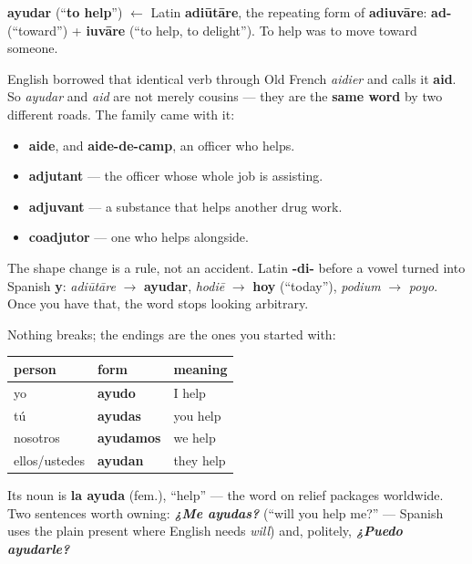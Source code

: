 \begin{cousinweb}
\textbf{ayudar} (\textquotedblleft{}\textbf{to help}\textquotedblright{}) $\leftarrow$ Latin \textbf{adiūtāre}, the repeating form of \textbf{adiuvāre}: \textbf{ad-} (\textquotedblleft{}toward\textquotedblright{}) + \textbf{iuvāre} (\textquotedblleft{}to help, to delight\textquotedblright{}). To help was to move toward someone.

English borrowed that identical verb through Old French \emph{aidier} and calls it \textbf{aid}. So \emph{ayudar} and \emph{aid} are not merely cousins — they are the \textbf{same word} by two different roads. The family came with it:

\begin{itemize}
\raggedright
  \item \textbf{aide}, and \textbf{aide-de-camp}, an officer who helps.
  \item \textbf{adjutant} — the officer whose whole job is assisting.
  \item \textbf{adjuvant} — a substance that helps another drug work.
  \item \textbf{coadjutor} — one who helps alongside.
\end{itemize}

The shape change is a rule, not an accident. Latin \textbf{-di-} before a vowel turned into Spanish \textbf{y}: \emph{adiūtāre} $\to$ \textbf{ayudar}, \emph{hodiē} $\to$ \textbf{hoy} (\textquotedblleft{}today\textquotedblright{}), \emph{podium} $\to$ \emph{poyo}. Once you have that, the word stops looking arbitrary.
\end{cousinweb}

\begin{grammarlens}[title={Grammar Lens: a plain -ar verb, and how to ask for a hand}]
Nothing breaks; the endings are the ones you started with:

\noindent
\begin{tabularx}{\linewidth}{@{}>{\raggedright\arraybackslash}X>{\raggedright\arraybackslash}X>{\raggedright\arraybackslash}X@{}}
\toprule
\textbf{person} & \textbf{form} & \textbf{meaning} \\
\midrule
yo & \textbf{ayudo} & I help \\
tú & \textbf{ayudas} & you help \\
nosotros & \textbf{ayudamos} & we help \\
ellos/ustedes & \textbf{ayudan} & they help \\
\bottomrule
\end{tabularx}

Its noun is \textbf{la ayuda} (fem.), \textquotedblleft{}help\textquotedblright{} — the word on relief packages worldwide. Two sentences worth owning: \emph{\textbf{¿Me ayudas?}} (\textquotedblleft{}will you help me?\textquotedblright{} — Spanish uses the plain present where English needs \emph{will}) and, politely, \emph{\textbf{¿Puedo ayudarle?}}
\end{grammarlens}

